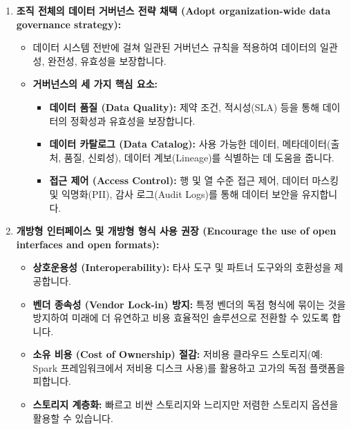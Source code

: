 \documentclass[11pt,a4paper]{article}
\begin{document}
\begin{enumerate}
    \item \textbf{조직 전체의 데이터 거버넌스 전략 채택 (Adopt organization-wide data governance strategy):}
    \begin{itemize}
        \item 데이터 시스템 전반에 걸쳐 일관된 거버넌스 규칙을 적용하여 데이터의 일관성, 완전성, 유효성을 보장합니다.
        \item \textbf{거버넌스의 세 가지 핵심 요소:}
        \begin{itemize}
            \item \textbf{데이터 품질 (Data Quality):} 제약 조건, 적시성(SLA) 등을 통해 데이터의 정확성과 유효성을 보장합니다.
            \item \textbf{데이터 카탈로그 (Data Catalog):} 사용 가능한 데이터, 메타데이터(출처, 품질, 신뢰성), 데이터 계보(Lineage)를 식별하는 데 도움을 줍니다.
            \item \textbf{접근 제어 (Access Control):} 행 및 열 수준 접근 제어, 데이터 마스킹 및 익명화(PII), 감사 로그(Audit Logs)를 통해 데이터 보안을 유지합니다.
        \end{itemize}
    \end{itemize}

    \item \textbf{개방형 인터페이스 및 개방형 형식 사용 권장 (Encourage the use of open interfaces and open formats):}
    \begin{itemize}
        \item \textbf{상호운용성 (Interoperability):} 타사 도구 및 파트너 도구와의 호환성을 제공합니다.
        \item \textbf{벤더 종속성 (Vendor Lock-in) 방지:} 특정 벤더의 독점 형식에 묶이는 것을 방지하여 미래에 더 유연하고 비용 효율적인 솔루션으로 전환할 수 있도록 합니다.
        \item \textbf{소유 비용 (Cost of Ownership) 절감:} 저비용 클라우드 스토리지(예: Spark 프레임워크에서 저비용 디스크 사용)를 활용하고 고가의 독점 플랫폼을 피합니다.
        \item \textbf{스토리지 계층화:} 빠르고 비싼 스토리지와 느리지만 저렴한 스토리지 옵션을 활용할 수 있습니다.
    \end{itemize}


\end{enumerate}
\end{document}
